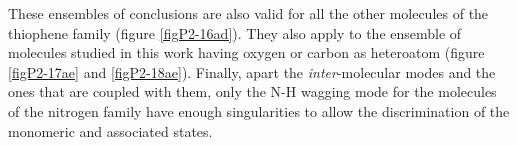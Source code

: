 	These ensembles of conclusions are also valid for all the other molecules of the thiophene family (figure \ref{figP2-16ad}). They also apply to the ensemble of molecules studied in this work having oxygen or carbon as heteroatom (figure \ref{figP2-17ae} and \ref{figP2-18ae}). Finally, apart the \textit{inter}-molecular modes and the ones that are coupled with them, only the N-H wagging mode for the molecules of the nitrogen family have enough singularities to allow the discrimination of the monomeric and associated states.
	
		
		\begin{figure}[H]
			\begin{center}
\end{center}
\end{figure}
